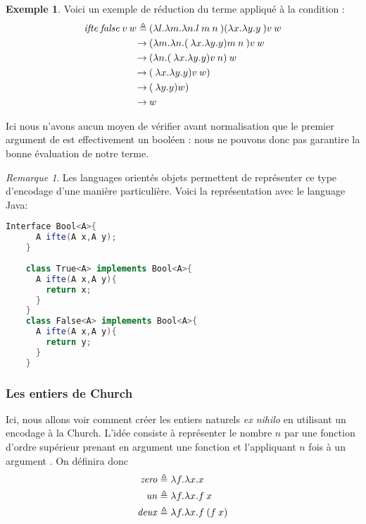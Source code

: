 \documentclass {article}
\theoremstyle{definition}
\newtheorem{example}{Exemple}
\theoremstyle{remark}
\newtheorem{remark}{Remarque}
\begin{document}
\begin{example}
  Voici un exemple de réduction du terme \Ifte{} appliqué à la condition \False{} :
  \begin{align*}
    \mathit{ifte}\:\mathit{false}{}\:v\:w  \triangleq&\: (\lambda l. \lambda m. \lambda n. l\:m\:n\:)({\lambda x. \lambda y. y}\:){v}\:w \\
    \rightarrow &\: ({\lambda m. \lambda n. (\:\lambda x. \lambda y. y){m}\:n}\:){v}\:w \\
    \rightarrow &\: (\lambda n. (\:\lambda x. \lambda y. y){v}\:n)\:w \\
    \rightarrow &\: (\:\lambda x. \lambda y. y){v}\:w) \\
    \rightarrow &\: (\:\lambda y. y){w}) \\
    \rightarrow &\: w
  \end{align*}
\end{example}

Ici nous n'avons aucun moyen de vérifier avant normalisation que le
premier argument de \Ifte{} est effectivement un booléen : nous ne
pouvons donc pas garantire la bonne évaluation de notre terme.

\begin{remark}
  Les languages orientés objets permettent de représenter ce type d'encodage d'une manière particulière.
  Voici la représentation avec le language Java:
  \begin{lstlisting}[language=java]
    Interface Bool<A>{
      A ifte(A x,A y);
    }
    
    class True<A> implements Bool<A>{
      A ifte(A x,A y){
        return x;
      }
    }
    class False<A> implements Bool<A>{
      A ifte(A x,A y){
        return y;
      }
    }    
  \end{lstlisting}
\end{remark}


\subsubsection{Les entiers de Church}

\newcommand{\Zero}{\mathit{zero}}
\newcommand{\Un}{\mathit{un}}
\newcommand{\Deux}{\mathit{deux}}
\newcommand{\Succ}{\mathit{successeur}}
\newcommand{\Plus}{\mathit{plus}}


Ici, nous allons voir comment créer les entiers naturels \textit{ex
  nihilo} en utilisant un encodage à la Church. L'idée consiste à
représenter le nombre \(n\) par une fonction d'ordre supérieur prenant
en argument une fonction  et l'appliquant \(n\) fois à un
argument . On définira donc
%
\begin{align*}
\Zero &\triangleq \Lam{f}{\Lam{x}{x}}\\ 
\Un   &\triangleq \Lam{f}{\Lam{x}{\App{f}{x}}} \\
\Deux &\triangleq \Lam{f}{\Lam{x}{\App{f}{(\App{f}{x}})}}
\end{align*}
\end{document}
